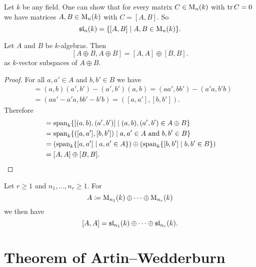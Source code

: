 \begin{rem}
  Let $k$ be any field.
  One can show that for every matrix $C \in \operatorname{M}_n(k)$ with $\operatorname{tr} C = 0$ we have matrices $A, B \in \operatorname{M}_n(k)$ with $C = [A,B]$.
  So
  \[
      \operatorname{\mathfrak{sl}}_n(k)
    = \{
        [A,B]
      \mid
        A, B \in \operatorname{M}_n(k)
      \}.
  \]
\end{rem}


\begin{lem}
  Let $A$ and $B$ be $k$-algebras. Then
  \[
      [A \oplus B, A \oplus B]
    = [A,A] \oplus [B,B].
  \]
  as $k$-vector subspaces of $A \oplus B$.
\end{lem}
\begin{proof}
  For all $a, a' \in A$ and $b, b' \in B$ we have
  \begin{align*}
        [(a,b),(a',b')]
    &=  (a,b)(a',b') - (a',b')(a,b)
     =  (aa',bb') - (a'a, b'b) \\
    &=  (aa'-a'a, bb' - b'b)
     =  ([a,a'], [b,b']).
  \end{align*}
  Therefore
  \begin{align*}
        [A \oplus B, A \oplus B]
    &=  \vspan_k  \{
                    [(a,b), (a',b')]
                  \mid
                    (a,b), (a',b') \in A \oplus B
                  \} \\
    &= \vspan_k \{
                  ([a,a'], [b,b'])
                \mid
                  a, a' \in A
                  \text{ and }
                  b, b' \in B
                \} \\
    &=  \left(
          \vspan_k \{ [a,a'] \mid a, a' \in A \}
        \right)
        \oplus
        \left(
          \vspan_k \{ [b,b'] \mid b, b' \in B \}
        \right) \\
    &= [A,A] \oplus [B,B].
    \qedhere
  \end{align*}
\end{proof}


\begin{cor}\label{cor: commutator product of matrix algebras}
  Let $r \geq 1$ and $n_1, \dots, n_r \geq 1$. For
  \[
    A \coloneqq \operatorname{M}_{n_1}(k) \oplus \dotsb \oplus \operatorname{M}_{n_r}(k)
  \]
  we then have
  \[
      [A,A]
    = \operatorname{\mathfrak{sl}}_{n_1}(k) \oplus \dotsb \oplus \operatorname{\mathfrak{sl}}_{n_r}(k).
  \]
\end{cor}





\section{Theorem of Artin--Wedderburn}


